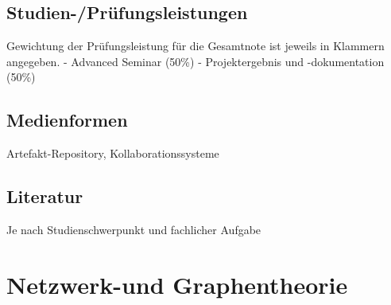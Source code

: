 \section*{Studien-/Prüfungsleistungen\label{/mi-2017/modulbeschreibungen-master/MA_Modul_Projekt_Vision&Konzept}}\label{studien-pruxfcfungsleistungenpathlabelmi-2017modulbeschreibungen-mastermaux5fmodulux5fprojektux5fvisionkonzept}

Gewichtung der Prüfungsleistung für die Gesamtnote ist jeweils in
Klammern angegeben. - Advanced Seminar (50\%) - Projektergebnis und
-dokumentation (50\%)

\section*{Medienformen\label{/mi-2017/modulbeschreibungen-master/MA_Modul_Projekt_Vision&Konzept}}\label{medienformenpathlabelmi-2017modulbeschreibungen-mastermaux5fmodulux5fprojektux5fvisionkonzept}

Artefakt-Repository, Kollaborationssysteme

\section*{Literatur\label{/mi-2017/modulbeschreibungen-master/MA_Modul_Projekt_Vision&Konzept}}\label{literaturpathlabelmi-2017modulbeschreibungen-mastermaux5fmodulux5fprojektux5fvisionkonzept}

Je nach Studienschwerpunkt und fachlicher Aufgabe

\chapter{Netzwerk-und
Graphentheorie\label{/mi-2017/modulbeschreibungen-master/MA_SC_Modul_Netzwerk--und-Graphentheorie}}\label{netzwerk-und-graphentheoriepathlabelmi-2017modulbeschreibungen-mastermaux5fscux5fmodulux5fnetzwerkund-graphentheorie}

